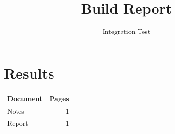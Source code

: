 \documentclass{article}
\title{Build Report}
\author{Integration Test}
\date{}
\begin{document}
\maketitle



\section{Results}
\begin{center}
\begin{tabular}{lr}
Document & Pages \\
\hline
Notes & 1 \\
Report & 1
\end{tabular}
\end{center}
\end{document}
